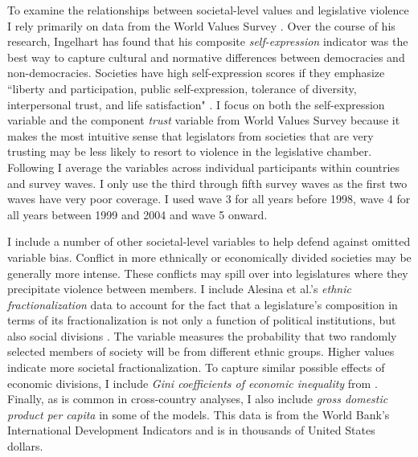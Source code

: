 \documentclass[a4paper]{article}\usepackage{graphicx, color}
\begin{document}
{{To examine the relationships between societal-level values and legislative violence I rely primarily on data from the World Values Survey \citep{WVS2009}. Over the course of his research, Ingelhart has found that his composite {\emph{self-expression}} indicator was the best way to capture cultural and normative differences between democracies and non-democracies. Societies have high self-expression scores if they emphasize ``liberty and participation, public self-expression, tolerance of diversity, interpersonal trust, and life satisfaction" \citep[64]{Inglehart2003}. I focus on both the self-expression variable and the component {\emph{trust}} variable from World Values Survey because it makes the most intuitive sense that legislators from societies that are very trusting may be less likely to resort to violence in the legislative chamber. Following \cite{Inglehart2003} I average the variables across individual participants within countries and survey waves. I only use the third through fifth survey waves as the first two waves have very poor coverage. I used wave 3 for all years before 1998, wave 4 for all years between 1999 and 2004 and wave 5 onward. 

I include a number of other societal-level variables to help defend against omitted variable bias. Conflict in more ethnically or economically divided societies may be generally more intense. These conflicts may spill over into legislatures where they precipitate violence between members. I include Alesina et al.'s \citeyearpar{Alesina2003} {\emph{ethnic fractionalization}} data to account for the fact that a legislature's composition in terms of its fractionalization is not only a function of political institutions, but also social divisions \citep{Neto1997, Mozaffar2003}. The variable measures the probability that two randomly selected members of society will be from different ethnic groups. Higher values indicate more societal fractionalization. To capture similar possible effects of economic divisions, I include {\emph{Gini coefficients of economic inequality}} from \cite{UNU2008}. Finally, as is common in cross-country analyses, I also include {\emph{gross domestic product per capita}} in some of the models. This data is from the World Bank's International Development Indicators \citeyearpar{WorldBank2011} and is in thousands of United States dollars.

}}
\end{document}
